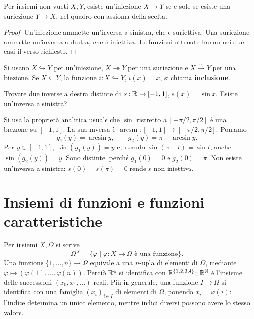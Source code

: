 \begin{corollario}
Per insiemi non vuoti $X,Y$, esiste un'iniezione $X\to Y$ se e solo se esiste una suriezione $Y\to X$, nel quadro con assioma della scelta.
\end{corollario}
\begin{proof}
Un'iniezione ammette un'inversa a sinistra, che è suriettiva. Una suriezione ammette un'inversa a destra, che è iniettiva. Le funzioni ottenute hanno nei due casi il verso richiesto.
\end{proof}

Si usano $X\hookrightarrow Y$ per un'iniezione, $X\twoheadrightarrow Y$ per una suriezione e $X\xrightarrow{\sim}Y$ per una biezione. Se $X\subseteq Y$, la funzione $i:X\hookrightarrow Y$, $i(x)=x$, si chiama \textbf{inclusione}.

\begin{esercizio}
Trovare due inverse a destra distinte di $s:\mathbb{R}\to[-1,1]$, $s(x)=\sin x$. Esiste un'inversa a sinistra?
\end{esercizio}
\begin{svolgimento}
Si usa la proprietà analitica usuale che $\sin$ ristretto a $[-\pi/2,\pi/2]$ è una biezione su $[-1,1]$. La sua inversa è $\arcsin:[-1,1]\to[-\pi/2,\pi/2]$. Poniamo
\[
g_1(y)=\arcsin y,\qquad g_2(y)=\pi-\arcsin y.
\]
Per $y\in[-1,1]$, $\sin(g_1(y))=y$ e, usando $\sin(\pi-t)=\sin t$, anche $\sin(g_2(y))=y$. Sono distinte, perché $g_1(0)=0$ e $g_2(0)=\pi$. Non esiste un'inversa a sinistra: $s(0)=s(\pi)=0$ rende $s$ non iniettiva.
\end{svolgimento}

\section{Insiemi di funzioni e funzioni caratteristiche}
\begin{definizione}
Per insiemi $X,\Omega$ si scrive
\[
\Omega^X=\{\varphi\mid \varphi:X\to\Omega\text{ è una funzione}\}.
\]
Una funzione $\{1,\ldots,n\}\to\Omega$ equivale a una $n$-upla di elementi di $\Omega$, mediante $\varphi\mapsto(\varphi(1),\ldots,\varphi(n))$. Perciò $\mathbb{R}^4$ si identifica con $\mathbb{R}^{\{1,2,3,4\}}$; $\mathbb{R}^{\mathbb{N}}$ è l'insieme delle successioni $(x_0,x_1,\ldots)$ reali. Più in generale, una funzione $I\to\Omega$ si identifica con una famiglia $(x_i)_{i\in I}$ di elementi di $\Omega$, ponendo $x_i=\varphi(i)$: l'indice determina un unico elemento, mentre indici diversi possono avere lo stesso valore. %

\end{definizione}

